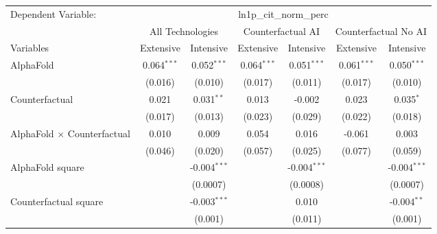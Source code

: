 \begingroup
\centering
\begin{tabular}{lcccccc}
   \tabularnewline \midrule \midrule
   Dependent Variable: & \multicolumn{6}{c}{ln1p\_cit\_norm\_perc}\\
 & \multicolumn{2}{c}{All Technologies} & \multicolumn{2}{c}{Counterfactual AI} & \multicolumn{2}{c}{Counterfactual No AI} \\
\cmidrule(lr){1-1}\cmidrule(lr){2-3} \cmidrule(lr){4-5} \cmidrule(lr){6-7}
Variables & \multicolumn{1}{c}{Extensive} & \multicolumn{1}{c}{Intensive} & \multicolumn{1}{c}{Extensive} & \multicolumn{1}{c}{Intensive} & \multicolumn{1}{c}{Extensive} & \multicolumn{1}{c}{Intensive} \\
\cmidrule(lr){1-1}\cmidrule(lr){2-2} \cmidrule(lr){3-3} \cmidrule(lr){4-4} \cmidrule(lr){5-5} \cmidrule(lr){6-6} \cmidrule(lr){7-7}
   AlphaFold                          & 0.064$^{***}$ & 0.052$^{***}$  & 0.064$^{***}$ & 0.051$^{***}$  & 0.061$^{***}$ & 0.050$^{***}$\\   
                                      & (0.016)       & (0.010)        & (0.017)       & (0.011)        & (0.017)       & (0.010)\\   
   Counterfactual                     & 0.021         & 0.031$^{**}$   & 0.013         & -0.002         & 0.023         & 0.035$^{*}$\\   
                                      & (0.017)       & (0.013)        & (0.023)       & (0.029)        & (0.022)       & (0.018)\\   
   AlphaFold $\times$ Counterfactual  & 0.010         & 0.009          & 0.054         & 0.016          & -0.061        & 0.003\\   
                                      & (0.046)       & (0.020)        & (0.057)       & (0.025)        & (0.077)       & (0.059)\\   
   AlphaFold square                   &               & -0.004$^{***}$ &               & -0.004$^{***}$ &               & -0.004$^{***}$\\   
                                      &               & (0.0007)       &               & (0.0008)       &               & (0.0007)\\   
   Counterfactual square              &               & -0.003$^{***}$ &               & 0.010          &               & -0.004$^{**}$\\   
                                      &               & (0.001)        &               & (0.011)        &               & (0.001)\\   

\end{tabular}

